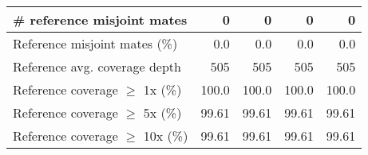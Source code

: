 \documentclass[12pt,a4paper]{article}
\begin{document}
\begin{table}[ht]
\begin{center}
\begin{tabular}{|l*{4}{|r}|}
\# reference misjoint mates & 0 & 0 & 0 & 0 \\ \hline
Reference misjoint mates (\%) & 0.0 & 0.0 & 0.0 & 0.0 \\ \hline
Reference avg. coverage depth & 505 & 505 & 505 & 505 \\ \hline
Reference coverage $\geq$ 1x (\%) & 100.0 & 100.0 & 100.0 & 100.0 \\ \hline
Reference coverage $\geq$ 5x (\%) & 99.61 & 99.61 & 99.61 & 99.61 \\ \hline
Reference coverage $\geq$ 10x (\%) & 99.61 & 99.61 & 99.61 & 99.61 \\ \hline
\end{tabular}
\end{center}
\end{table}
\end{document}
